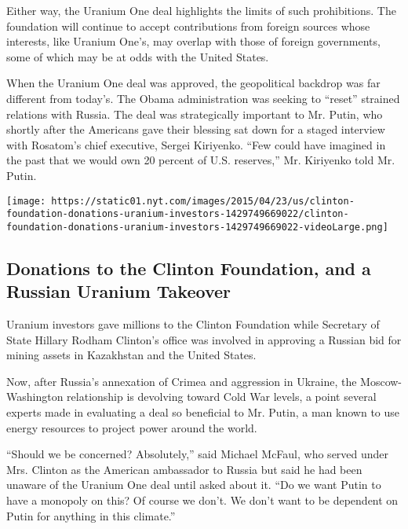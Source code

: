 Either way, the Uranium One deal highlights the limits of such
prohibitions. The foundation will continue to accept contributions from
foreign sources whose interests, like Uranium One's, may overlap with
those of foreign governments, some of which may be at odds with the
United States.

When the Uranium One deal was approved, the geopolitical backdrop was
far different from today's. The Obama administration was seeking to
``reset'' strained relations with Russia. The deal was strategically
important to Mr. Putin, who shortly after the Americans gave their
blessing sat down for a staged interview with Rosatom's chief executive,
Sergei Kiriyenko. ``Few could have imagined in the past that we would
own 20 percent of U.S. reserves,'' Mr. Kiriyenko told Mr. Putin.

\href{https://www.nytimes.com/interactive/2015/04/23/us/clinton-foundation-donations-uranium-investors.html}{}

\texttt{[image: https://static01.nyt.com/images/2015/04/23/us/clinton-foundation-donations-uranium-investors-1429749669022/clinton-foundation-donations-uranium-investors-1429749669022-videoLarge.png]}

\hypertarget{donations-to-the-clinton-foundation-and-a-russian-uranium-takeover}{%
\subsection{Donations to the Clinton Foundation, and a Russian Uranium
Takeover}\label{donations-to-the-clinton-foundation-and-a-russian-uranium-takeover}}

Uranium investors gave millions to the Clinton Foundation while
Secretary of State Hillary Rodham Clinton's office was involved in
approving a Russian bid for mining assets in Kazakhstan and the United
States.

Now, after Russia's annexation of Crimea and aggression in Ukraine, the
Moscow-Washington relationship is devolving toward Cold War levels, a
point several experts made in evaluating a deal so beneficial to Mr.
Putin, a man known to use energy resources to project power around the
world.

``Should we be concerned? Absolutely,'' said Michael McFaul, who served
under Mrs. Clinton as the American ambassador to Russia but said he had
been unaware of the Uranium One deal until asked about it. ``Do we want
Putin to have a monopoly on this? Of course we don't. We don't want to
be dependent on Putin for anything in this climate.''

